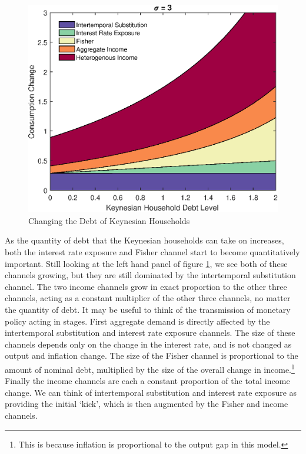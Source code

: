 \documentclass[titlepage]{\econtex}\newcommand{\texname}{ConsumptionHeterogeneity}
\begin{document}
\begin{figure}
\begin{centering}
		\includegraphics[scale=0.4]{../Matlab/DynareCode/Figures/KeynesianDebt_sigma3.eps}
		\caption{Changing the Debt of Keynesian Households}
		\label{fig:KeynesianDebt}
	\end{centering}
\end{figure}

As the quantity of debt that the Keynesian households can take on increases, both the interest rate exposure and Fisher channel start to become quantitatively important. Still looking at the left hand panel of figure \ref{fig:KeynesianDebt}, we see both of these channels growing, but they are still dominated by the intertemporal substitution channel. The two income channels grow in exact proportion to the other three channels, acting as a constant multiplier of the other three channels, no matter the quantity of debt. It may be useful to think of the transmission of monetary policy acting in stages. First aggregate demand is directly affected by the intertemporal substitution and interest rate exposure channels. The size of these channels depends only on the change in the interest rate, and is not changed as output and inflation change. The size of the Fisher channel is proportional to the amount of nominal debt, multiplied by the size of the overall change in income.\footnote{This is because inflation is proportional to the output gap in this model.} Finally the income channels are each a constant proportion of the total income change. We can think of intertemporal substitution and interest rate exposure as providing the initial `kick', which is then augmented by the Fisher and income channels.
\end{document}
